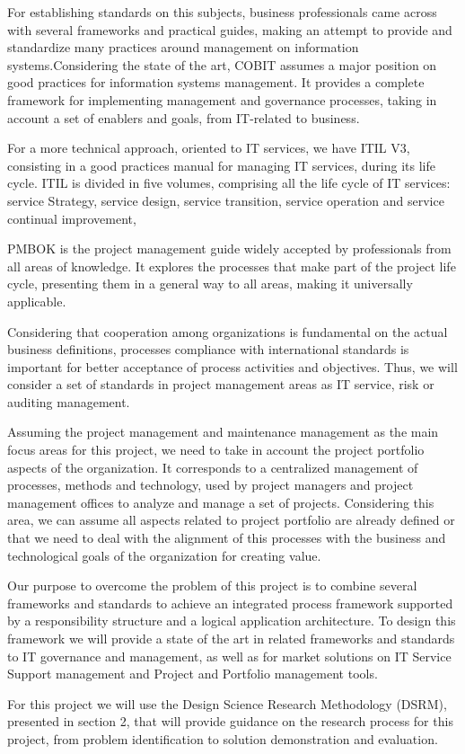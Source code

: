 For establishing standards on this subjects, business professionals came across with several frameworks and practical guides, making an attempt to provide and standardize many practices around management on information systems.Considering the state of the art, COBIT assumes a major position on good practices for information systems management. It provides a complete framework for implementing management and governance processes, taking in account a set of enablers and goals, from IT-related to business.\par
For a more technical approach, oriented to IT services, we have ITIL V3, consisting in a good practices manual for managing IT services, during its life cycle. ITIL is divided in five volumes, comprising all the life cycle of IT services: service Strategy, service design, service transition, service operation and service continual improvement,\par
PMBOK is the project management guide widely accepted by professionals from all areas of knowledge. It explores the processes that make part of the project life cycle, presenting them in a general way to all areas, making it universally applicable.\par
Considering that cooperation among organizations is fundamental on the actual business definitions, processes compliance with international standards is important for better acceptance of process activities and objectives. Thus, we will consider a set of standards in project management areas as IT service, risk or auditing management.\par   
Assuming the project management and maintenance management as the main focus areas for this project, we need to take in account the project portfolio aspects of the organization. It corresponds to a centralized management of processes, methods and technology, used by project managers and project management offices to analyze and manage a set of projects. Considering this area, we can assume all aspects related to project portfolio are already defined or that we need to deal with the alignment of this processes with the business and technological goals of the organization for creating value.\par
Our purpose to overcome the problem of this project is to combine several frameworks and standards to achieve an integrated process framework supported by a responsibility structure and a logical application architecture. To design this framework we will provide a state of the art in related frameworks and standards to IT governance and management, as well as for market solutions on IT Service Support management and Project and Portfolio management tools.\par
For this project we will use the Design Science Research Methodology (DSRM)\cite{DSRM}, presented in section 2, that will provide guidance on the research process for this project, from problem identification to solution demonstration and evaluation.\par